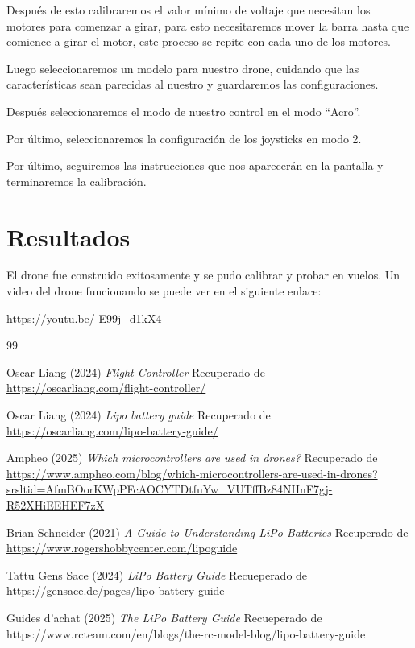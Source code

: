 \documentclass[pdflatex,sn-mathphys-num]{sn-jnl}%
\begin{document}
Después de esto calibraremos el valor mínimo de voltaje que necesitan los motores para comenzar a girar, para esto necesitaremos mover la barra hasta que comience a girar el motor, este proceso se repite con cada uno de los motores.

Luego seleccionaremos un modelo para nuestro drone, cuidando que las características sean parecidas al nuestro y guardaremos las configuraciones.

Después seleccionaremos el modo de nuestro control en el modo ``Acro''.

Por último, seleccionaremos la configuración de los joysticks en modo 2.

Por último, seguiremos las instrucciones que nos aparecerán en la pantalla y terminaremos la calibración.

\section{Resultados}

El drone fue construido exitosamente y se pudo calibrar y probar en vuelos. Un video del drone funcionando se puede ver en el siguiente enlace:

\begin{center}
\url{https://youtu.be/-E99j_d1kX4}
\end{center}


\begin{thebibliography}{99}

Oscar Liang (2024) \textit{Flight Controller}
Recuperado de \url{https://oscarliang.com/flight-controller/}

Oscar Liang (2024) \textit{Lipo battery guide}
Recuperado de \url{https://oscarliang.com/lipo-battery-guide/
}


Ampheo (2025) \textit{Which microcontrollers are used in drones?}
Recuperado de \url{https://www.ampheo.com/blog/which-microcontrollers-are-used-in-drones?srsltid=AfmBOorKWpPFcAOCYTDtfuYw_VUTffBz84NHnF7gj-R52XHiEEHEF7zX}

Brian Schneider  (2021) \textit{A Guide to Understanding LiPo Batteries} 
Recuperado de \url{https://www.rogershobbycenter.com/lipoguide}
 

Tattu Gens Sace  (2024) \textit{LiPo Battery Guide} 
Recueperado de https://gensace.de/pages/lipo-battery-guide


Guides d'achat  (2025) \textit{The LiPo Battery Guide} 
Recueperado de https://www.rcteam.com/en/blogs/the-rc-model-blog/lipo-battery-guide

\end{thebibliography}
\end{document}
